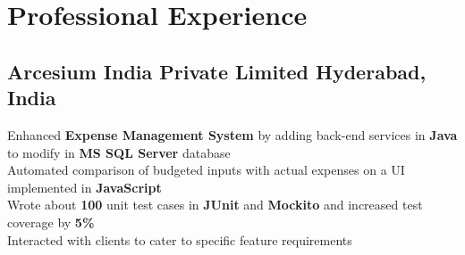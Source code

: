 \documentclass[]{Keval-resume}
\begin{document}

\section{Professional Experience} 
\hrulefill
\postsectionsep

\subsection{Arcesium India Private Limited \hfill \normalfont H\lowercase{yderabad}, I\lowercase{ndia}}
\textbullet{} Enhanced \textbf{Expense Management System} by adding back-end services in \textbf{Java} to modify in \textbf{MS SQL Server} database \\
\textbullet{} Automated comparison of budgeted inputs with actual expenses on a UI implemented in \textbf{JavaScript} \\
\textbullet{} Wrote about \textbf{100} unit test cases in \textbf{JUnit} and \textbf{Mockito} and increased test coverage by \textbf{5\%} \\
\textbullet{} Interacted with clients to cater to specific feature requirements

\sectionsep

\end{document}
